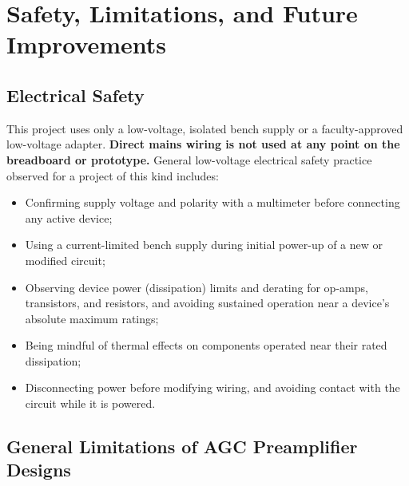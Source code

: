 \chapter{Safety, Limitations, and Future Improvements}
\label{ch:safety}

\section{Electrical Safety}

This project uses only a low-voltage, isolated bench supply or a faculty-approved low-voltage adapter. \textbf{Direct mains wiring is not used at any point on the breadboard or prototype.} General low-voltage electrical safety practice observed for a project of this kind includes:
\begin{itemize}
    \item Confirming supply voltage and polarity with a multimeter before connecting any active device;
    \item Using a current-limited bench supply during initial power-up of a new or modified circuit;
    \item Observing device power (dissipation) limits and derating for op-amps, transistors, and resistors, and avoiding sustained operation near a device's absolute maximum ratings;
    \item Being mindful of thermal effects on components operated near their rated dissipation;
    \item Disconnecting power before modifying wiring, and avoiding contact with the circuit while it is powered.
\end{itemize}

\section{General Limitations of AGC Preamplifier Designs}

